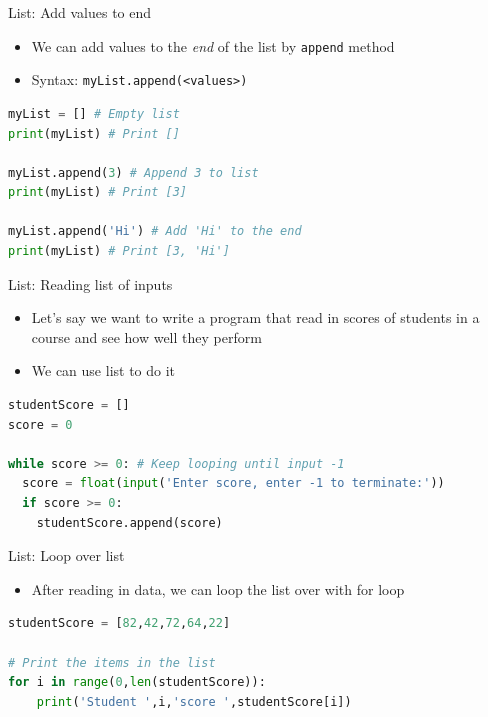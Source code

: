 \documentclass[10pt,xcolor={table,dvipsnames},t]{beamer}
\begin{document}
\begin{frame}[fragile]{List: Add values to end}
  \begin{itemize}
    \item We can add values to the \textit{end} of the list by \texttt{append} method
    \item Syntax: \texttt{myList.append(<values>)}
  \end{itemize}
\begin{lstlisting}[language=python]
myList = [] # Empty list
print(myList) # Print []

myList.append(3) # Append 3 to list
print(myList) # Print [3]

myList.append('Hi') # Add 'Hi' to the end 
print(myList) # Print [3, 'Hi']
\end{lstlisting}
\end{frame}

\begin{frame}[fragile]{List: Reading list of inputs}
  \begin{itemize}
    \item Let's say we want to write a program that read in scores of students in a course and see how well they perform
    \item We can use list to do it
  \end{itemize}
\begin{lstlisting}[language=python]
studentScore = []
score = 0

while score >= 0: # Keep looping until input -1
  score = float(input('Enter score, enter -1 to terminate:'))
  if score >= 0:
    studentScore.append(score)
\end{lstlisting}
\end{frame}

\begin{frame}[fragile]{List: Loop over list}
  \begin{itemize}
    \item After reading in data, we can loop the list over with for loop
  \end{itemize}
\begin{lstlisting}[language=python]
studentScore = [82,42,72,64,22]

# Print the items in the list
for i in range(0,len(studentScore)):
    print('Student ',i,'score ',studentScore[i])
  
\end{lstlisting}
\end{frame}
\end{document}
